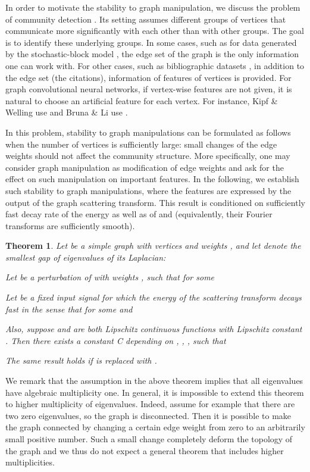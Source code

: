 \documentclass{article}
\newtheorem{theorem}{Theorem}[section]
\begin{document}
{In order to motivate the stability to graph manipulation, we discuss the problem of community detection \cite{For10}. Its setting assumes different groups of vertices that communicate more significantly with each other than with other groups. The goal is to identify these underlying groups.} In some cases, such as for data generated by the stochastic-block model \cite{Abb17}, the edge set of the graph is the only information one can work with. For other cases, such as bibliographic datasets \cite{SenNB08}, in addition to the edge set (the citations), information of features of vertices is provided. For graph convolutional neural networks, if vertex-wise features are not given, it is natural to choose an artificial feature for each vertex. For instance, Kipf \& Welling \cite{KipW16} use  and Bruna \& Li \cite{BruL17} use .

{In this problem, stability to graph manipulations can be formulated as follows when the number of vertices is sufficiently large: small changes of the edge weights should not affect the community structure.
More specifically, one may consider graph manipulation as modification of edge weights and ask for the effect on such manipulation on important features. In the following, we establish such stability to graph manipulations, where the features are expressed by the output of the graph scattering transform. This result is conditioned on sufficiently fast decay rate of the energy as well as of  and  (equivalently, their Fourier transforms are sufficiently smooth).
\begin{theorem}\label{thm:weightperturb}
Let  be a simple graph with  vertices and weights , and let  denote the smallest gap of eigenvalues of its Laplacian:

Let  be a perturbation of  with weights , such that for some 

Let  be a fixed input signal for which the energy of the scattering transform decays fast in the sense that for some  and  

Also, suppose  and  are both Lipschitz continuous functions with Lipschitz constant .
Then there exists a constant C depending on , , , such that

The same result holds if  is replaced with .
\end{theorem}
}

{We remark that the assumption  in the above theorem implies that all eigenvalues have algebraic multiplicity one. In general, it is impossible to extend this theorem to higher multiplicity of eigenvalues. Indeed, assume for example that there are two zero eigenvalues, so the graph is disconnected. Then it is possible to make the graph connected by changing a certain edge weight from zero to an arbitrarily small positive number. Such a small change completely deform the topology of the graph and we thus do not expect a general theorem that includes higher multiplicities.}
\end{document}
